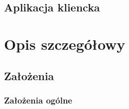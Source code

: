 \subsection*[Aplikacja kliencka]{Aplikacja kliencka}

\par{}

\section[Opis szczegółowy]{Opis szczegółowy}

\subsection[Założenia]{Założenia}

\subsubsection*[Założenia ogólne]{Założenia ogólne} \label{z:o}

